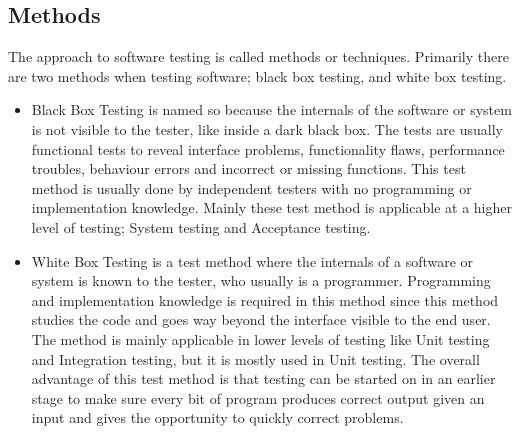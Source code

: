 \subsection{Methods}
The approach to software testing is called methods or techniques. Primarily there are two methods when testing software; black box testing, and white box testing.
\begin{itemize}
\item \label{def:blackboxtesting} Black Box Testing is named so because the internals of the software or system is not visible to the tester, like inside a dark black box. The tests are usually functional tests to reveal interface problems, functionality flaws, performance troubles, behaviour errors and incorrect or missing functions. This test method is usually done by independent testers with no programming or implementation knowledge. Mainly these test method is applicable at a higher level of testing; System testing and Acceptance testing.
\item White Box Testing is a test method where the internals of a software or system is known to the tester, who usually is a programmer. Programming and implementation knowledge is required in this method since this method studies the code and goes way beyond the interface visible to the end user. The method is mainly applicable in lower levels of testing like Unit testing and Integration testing, but it is mostly used in Unit testing. The overall advantage of this test method is that testing can be started on in an earlier stage to make sure every bit of program produces correct output given an input and gives the opportunity to quickly correct problems.
\end{itemize}
